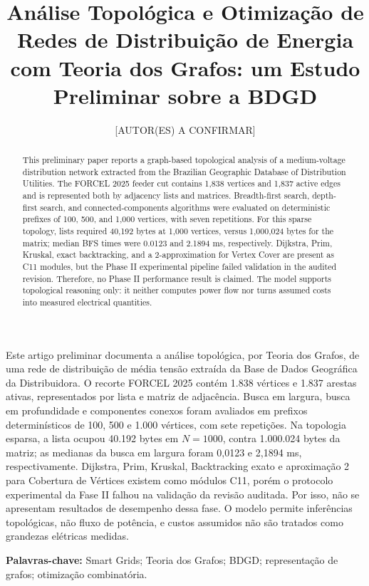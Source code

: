 \documentclass[12pt]{article}
\title{Análise Topológica e Otimização de Redes de Distribuição de Energia com Teoria dos Grafos: um Estudo Preliminar sobre a BDGD}
\author{[AUTOR(ES) A CONFIRMAR]}
\begin{document}
\maketitle

\begin{abstract}
This preliminary paper reports a graph-based topological analysis of a medium-voltage distribution network extracted from the Brazilian Geographic Database of Distribution Utilities. The FORCEL 2025 feeder cut contains 1,838 vertices and 1,837 active edges and is represented both by adjacency lists and matrices. Breadth-first search, depth-first search, and connected-components algorithms were evaluated on deterministic prefixes of 100, 500, and 1,000 vertices, with seven repetitions. For this sparse topology, lists required 40,192 bytes at 1,000 vertices, versus 1,000,024 bytes for the matrix; median BFS times were 0.0123 and 2.1894 ms, respectively. Dijkstra, Prim, Kruskal, exact backtracking, and a 2-approximation for Vertex Cover are present as C11 modules, but the Phase II experimental pipeline failed validation in the audited revision. Therefore, no Phase II performance result is claimed. The model supports topological reasoning only: it neither computes power flow nor turns assumed costs into measured electrical quantities.
\end{abstract}

\begin{resumo}
Este artigo preliminar documenta a análise topológica, por Teoria dos Grafos, de uma rede de distribuição de média tensão extraída da Base de Dados Geográfica da Distribuidora. O recorte FORCEL 2025 contém 1.838 vértices e 1.837 arestas ativas, representados por lista e matriz de adjacência. Busca em largura, busca em profundidade e componentes conexos foram avaliados em prefixos determinísticos de 100, 500 e 1.000 vértices, com sete repetições. Na topologia esparsa, a lista ocupou 40.192 bytes em $N=1000$, contra 1.000.024 bytes da matriz; as medianas da busca em largura foram 0,0123 e 2,1894 ms, respectivamente. Dijkstra, Prim, Kruskal, Backtracking exato e aproximação 2 para Cobertura de Vértices existem como módulos C11, porém o protocolo experimental da Fase II falhou na validação da revisão auditada. Por isso, não se apresentam resultados de desempenho dessa fase. O modelo permite inferências topológicas, não fluxo de potência, e custos assumidos não são tratados como grandezas elétricas medidas.
\end{resumo}

\noindent\textbf{Palavras-chave:} Smart Grids; Teoria dos Grafos; BDGD; representação de grafos; otimização combinatória.
\end{document}
